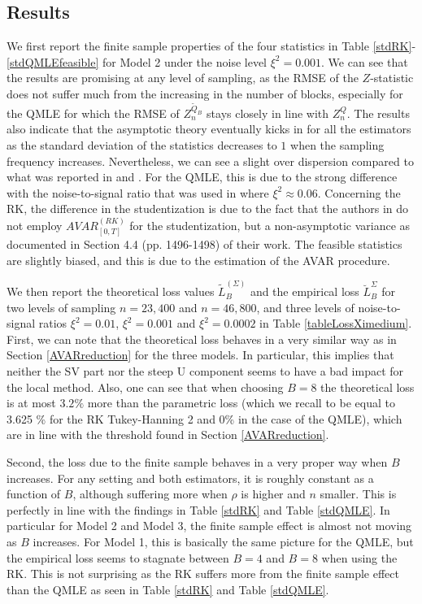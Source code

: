 \documentclass[11pt]{article}
\numberwithin{equation}{section}
\theoremstyle{plain}
\theoremstyle{remark}
\begin{document}
\subsection{Results}
\label{results}
We first report the finite sample properties of the four statistics in Table \ref{stdRK}-\ref{stdQMLEfeasible} for Model 2 under the noise level $\xi^2=0.001$. We can see that the results are promising at any level of sampling, as the RMSE of the $Z$-statistic does not suffer much from the increasing in the number of blocks, especially for the QMLE for which the RMSE of $Z_n^{\tilde{Q}_B}$ stays closely in line with $Z_n^{Q}$. The results also indicate that the asymptotic theory eventually kicks in for all the estimators as the standard deviation of the statistics decreases to $1$ when the sampling frequency increases. Nevertheless, we can see a slight over dispersion compared to what was reported in \cite{xiu2010quasi} and \cite{barndorff2008designing}. For the QMLE, this is due to the strong difference with the noise-to-signal ratio that was used in \cite{xiu2010quasi} where $\xi^2 \approx 0.06$. Concerning the RK, the difference in the studentization is due to the fact that the authors in \cite{barndorff2008designing} do not employ $AVAR_{[0,T]}^{(RK)}$ for the studentization, but a non-asymptotic variance as documented in Section 4.4 (pp. 1496-1498) of their work. The feasible statistics are slightly biased, and this is due to the estimation of the AVAR procedure.

\smallskip
We then report the theoretical loss values $\tilde{L}_B^{(\Sigma)}$ and the empirical loss $\breve{L}_B^{\Sigma}$ for two levels of sampling $n=23,400$ and $n=46,800$, and three levels of noise-to-signal ratios $\xi^2 = 0.01$, $\xi^2 = 0.001$ and $\xi^2 = 0.0002$ in Table \ref{tableLossXimedium}. First, we can note that the theoretical loss behaves in a very similar way as in Section \ref{AVARreduction} for the three models. In particular, this implies that neither the SV part nor the steep U component seems to have a bad impact for the local method. Also, one can see that when choosing $B=8$ the theoretical loss is at most $3.2 \%$ more than the parametric loss (which we recall to be equal to 3.625 \% for the RK Tukey-Hanning 2 and 0\% in the case of the QMLE), which are in line with the threshold found in Section \ref{AVARreduction}.

\smallskip
Second, the loss due to the finite sample behaves in a very proper way when $B$ increases. For any setting and both estimators, it is roughly constant as a function of $B$, although suffering more when $\rho$ is higher and $n$ smaller. This is perfectly in line with the findings in Table \ref{stdRK} and Table \ref{stdQMLE}. In particular for Model 2 and Model 3, the finite sample effect is almost not moving as $B$ increases. For Model 1, this is basically the same picture for the QMLE, but the empirical loss seems to stagnate between $B=4$ and $B=8$ when using the RK. This is not surprising as the RK suffers more from the finite sample effect than the QMLE as seen in Table \ref{stdRK} and Table \ref{stdQMLE}.  
\end{document}
